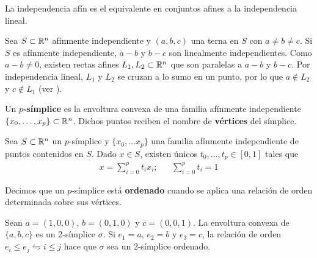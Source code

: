 \begin{marginfigure}
\caption[Puntos afínmente independientes]{La independencia afín es el equivalente en conjuntos afines a la independencia lineal.}
\end{marginfigure}

Sea $S \subset \mathbb{R}^n$ afínmente independiente y $(a,b,c)$ una terna en $S$ con $a\neq b \neq c$.
Si $S$ es afínmente independiente, $a-b$ y $b-c$ son linealmente independientes.
Como $a-b\neq 0$, existen rectas afines $L_1,L_2 \subset \mathbb{R}^n$ que son paralelas a $a-b$ y $b-c$.
Por independencia lineal, $L_1$ y $L_2$ se cruzan a lo sumo en un punto, por lo que $a \not\in L_2$ y $c \not\in L_1$ (ver ).

\begin{definition}
	Un \textbf{$p$-símplice} es la envoltura convexa de una familia afínmente independiente $\{x_0, \dots,x_p\} \subset \mathbb{R}^n$.
	Dichos puntos reciben el nombre de \textbf{vértices} del símplice.
\end{definition}


\begin{proposition}
	Sea $S\subset \mathbb{R}^n$ un $p$-símplice y $\{x_0,\dots x_p\}$ una familia afínmente independiente de puntos contenidos en $S$.
	Dado $x \in S$, existen únicos $t_0,\dots, t_p \in [0,1]$ tales que
	\begin{align*}
		x=\sum^p_{i=0}t_ix_i; && \sum^p_{i=0}t_i=1
	\end{align*}
\end{proposition}

Decimos que un $p$-símplice está \textbf{ordenado} cuando se aplica una relación de orden determinada sobre sus vértices.

\begin{example}
	Sean $a=(1,0,0)$, $b=(0,1,0)$ y $c=(0,0,1)$.
	La envoltura convexa de $\{a,b,c\}$ es un 2-símplice $\sigma$.
	Si $e_1=a$, $e_2=b$ y $e_3=c$, la relación de orden $e_i \leq e_j \leftrightharpoons i \leq j$ hace que $\sigma$ sea un 2-símplice ordenado.
\end{example}

